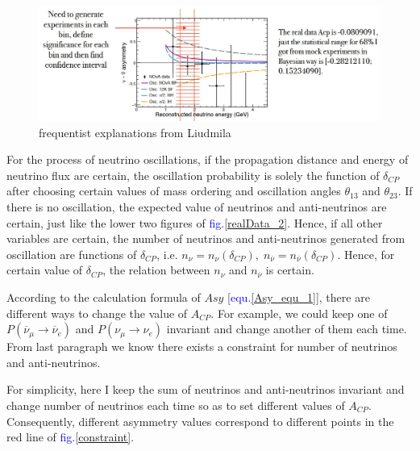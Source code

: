 \documentclass[a4paper,12pt]{article}
\begin{document}
\begin{figure}[htbp]
    \centering
    \includegraphics[width=13cm]{Images/onePointFive.JPG}
    \caption{frequentist explanations from Liudmila}
    \label{frequentistLiu}
\end{figure} 

For the process of neutrino oscillations, if the propagation distance and energy of neutrino flux are certain, the oscillation probability is solely the function of $\delta_{CP}$ after choosing certain values of mass ordering and oscillation angles $\theta_{13}$ and $\theta_{23}$. 
If there is no oscillation, the expected value of neutrinos and anti-neutrinos are certain, just like the lower two figures of \textcolor{blue}{fig.\ref{realData_2}}.
Hence, if all other variables are certain, the number of neutrinos and anti-neutrinos generated from oscillation are functions of $\delta_{CP}$, i.e. $n_\nu=n_\nu\left(\delta_{CP}\right),\;n_{\overline\nu}=n_{\overline\nu}\left(\delta_{CP}\right)$. Hence, for certain value of $\delta_{CP}$, the relation between $n_\nu$ and $n_{\overline\nu}$ is certain. 

According to the calculation formula of $Asy$ [\textcolor{blue}{equ.\ref{Asy_equ_1}}], there are different ways to change the value of $A_{CP}$. For example, we could keep one of $P\left({\overline\nu}_\mu \rightarrow {\overline\nu}_e\right)$ and $P\left(\nu_\mu \rightarrow \nu_e\right)$ invariant and change another of them each time. From last paragraph we know there exists a constraint for number of neutrinos and anti-neutrinos.

For simplicity, here I keep the sum of neutrinos and anti-neutrinos invariant and change number of neutrinos each time so as to set different values of $A_{CP}$. Consequently, different asymmetry values correspond to different points in the red line of \textcolor{blue}{fig.\ref{constraint}}. 
\end{document}
